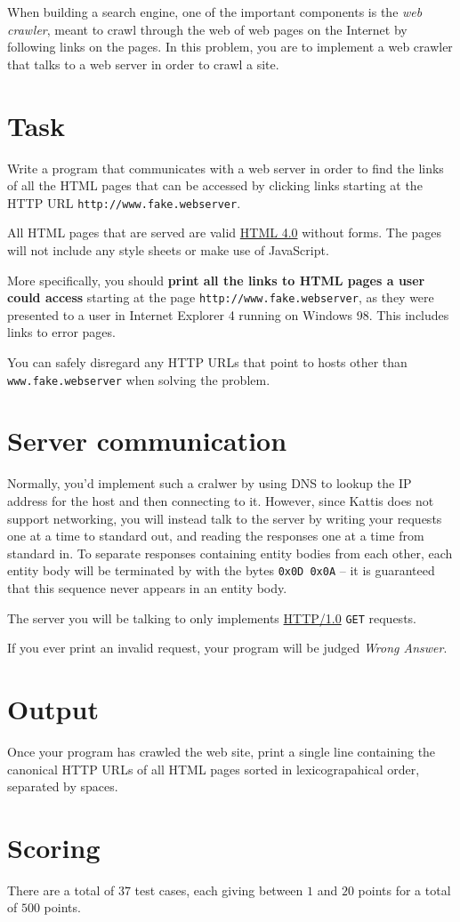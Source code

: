 When building a search engine, one of the important components is the \emph{web crawler}, meant to crawl through the web of web pages on the Internet by following links on the pages.
In this problem, you are to implement a web crawler that talks to a web server in order to crawl a site.

\section*{Task}
Write a program that communicates with a web server in order to find the links of all the HTML pages that can be accessed by clicking links starting at the HTTP URL \texttt{http://www.fake.webserver}.

All HTML pages that are served are valid \href{https://www.w3.org/TR/1998/REC-html40-19980424/}{HTML 4.0} without forms.
The pages will not include any style sheets or make use of JavaScript.

More specifically, you should \textbf{print all the links to HTML pages a user could access} starting at the page \texttt{http://www.fake.webserver}, as they were presented to a user in Internet Explorer 4 running on Windows 98.
This includes links to error pages.

You can safely disregard any HTTP URLs that point to hosts other than \texttt{www.fake.webserver} when solving the problem.

\section*{Server communication}
Normally, you'd implement such a cralwer by using DNS to lookup the IP address for the host and then connecting to it.
However, since Kattis does not support networking, you will instead talk to the server by writing your requests one at a time to standard out, and reading the responses one at a time from standard in. To separate responses containing entity bodies from each other, each entity body will be terminated by with the bytes \texttt{0x0D 0x0A} -- it is guaranteed that this sequence never appears in an entity body.

The server you will be talking to only implements \href{https://www.w3.org/Protocols/HTTP/1.0/spec.html}{HTTP/1.0} \texttt{GET} requests.

If you ever print an invalid request, your program will be judged \emph{Wrong Answer}.

\section*{Output}
Once your program has crawled the web site, print a single line containing the canonical HTTP URLs of all HTML pages sorted in lexicograpahical order, separated by spaces.

\section*{Scoring}
There are a total of $37$ test cases, each giving between $1$ and $20$ points for a total of $500$ points.
